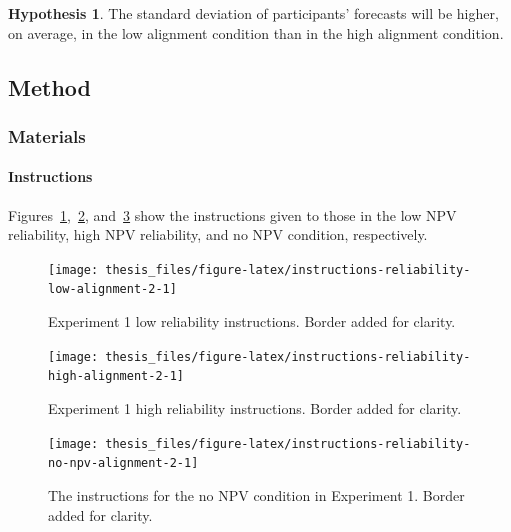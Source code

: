 \documentclass[a4paper, nobind, dvipsnames]{templates/ociamthesis}
\theoremstyle{definition}
\theoremstyle{definition}
\theoremstyle{definition}
\theoremstyle{definition}
\newtheorem{hypothesis}{Hypothesis}[chapter]
\theoremstyle{remark}
\begin{document}
\begin{hypothesis}
\protect\hypertarget{hyp:forecasting-sd-alignment-alignment-2}{}{\label{hyp:forecasting-sd-alignment-alignment-2} }The standard deviation of participants' forecasts will be higher, on average,
in the low alignment condition than in the high alignment condition.
\end{hypothesis}

\hypertarget{method-10}{%
\subsection{Method}\label{method-10}}

\hypertarget{materials-9}{%
\subsubsection{Materials}\label{materials-9}}

\hypertarget{instructions-materials-alignment-2-appendix}{%
\paragraph{Instructions}\label{instructions-materials-alignment-2-appendix}}

Figures~\ref{fig:instructions-reliability-low-alignment-2},~\ref{fig:instructions-reliability-high-alignment-2},
and~\ref{fig:instructions-reliability-no-npv-alignment-2} show the instructions
given to those in the low NPV reliability, high NPV reliability, and no NPV
condition, respectively.



\begin{figure}
\texttt{[image: thesis\_files/figure-latex/instructions-reliability-low-alignment-2-1]} \caption{Experiment 1 low reliability instructions. Border added for clarity.}\label{fig:instructions-reliability-low-alignment-2}
\end{figure}



\begin{figure}
\texttt{[image: thesis\_files/figure-latex/instructions-reliability-high-alignment-2-1]} \caption{Experiment 1 high reliability instructions. Border added for clarity.}\label{fig:instructions-reliability-high-alignment-2}
\end{figure}



\begin{figure}
\texttt{[image: thesis\_files/figure-latex/instructions-reliability-no-npv-alignment-2-1]} \caption{The instructions for the no NPV condition in Experiment 1. Border added for clarity.}\label{fig:instructions-reliability-no-npv-alignment-2}
\end{figure}
\end{document}
